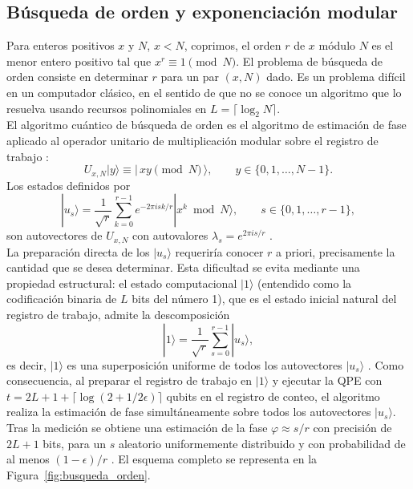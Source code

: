 \documentclass[12pt, spanish]{book}
\begin{document}
\subsection{Búsqueda de orden y exponenciación modular}
\label{sec:order_finding}

Para enteros positivos $x$ y $N$, $x < N$, coprimos, el orden $r$ de $x$ módulo $N$ es el menor entero positivo tal que $x^r \equiv 1 \pmod N$. El problema de búsqueda de orden consiste en determinar $r$ para un par $(x, N)$ dado. Es un problema difícil en un computador clásico, en el sentido de que no se conoce un algoritmo que lo resuelva usando recursos polinomiales en $L = \lceil \log_2 N \rceil$.\\  

El algoritmo cuántico de búsqueda de orden es el algoritmo de estimación de fase aplicado al operador unitario de multiplicación modular sobre el registro de trabajo \cite{Nielsen2024}:
\begin{equation}
    U_{x,N} |y\rangle \equiv |\,x y \pmod N\,\rangle, \qquad y \in \{0,1,\dots,N-1\}.
    \label{eq:U_def}
\end{equation}
Los estados definidos por
\begin{equation}
    |u_s\rangle = \frac{1}{\sqrt{r}} \sum_{k=0}^{r-1} e^{-2\pi i s k / r} |x^k \bmod N\rangle, \qquad s \in \{0, 1, \dots, r-1\},
    \label{eq:autovectores_U}
\end{equation}
son autovectores de $U_{x,N}$ con autovalores $\lambda_s = e^{2\pi i s / r}$ \cite{Nielsen2024}.\\

La preparación directa de los $|u_s\rangle$ requeriría conocer $r$ a priori, precisamente la cantidad que se desea determinar. Esta dificultad se evita mediante una propiedad estructural: el estado computacional $|1\rangle$ (entendido como la codificación binaria de $L$ bits del número 1), que es el estado inicial natural del registro de trabajo, admite la descomposición
\[
    |1\rangle = \frac{1}{\sqrt{r}}\sum_{s=0}^{r-1}|u_s\rangle,
\]
es decir, $|1\rangle$ es una superposición uniforme de todos los autovectores $|u_s\rangle$ \cite{Nielsen2024}. Como consecuencia, al preparar el registro de trabajo en $|1\rangle$ y ejecutar la QPE con $t = 2L + 1 + \lceil\log(2+1/2\epsilon)\rceil$ qubits en el registro de conteo, el algoritmo realiza la estimación de fase simultáneamente sobre todos los autovectores $|u_s\rangle$. Tras la medición se obtiene una estimación de la fase $\varphi \approx s/r$ con precisión de $2L+1$ bits, para un $s$ aleatorio uniformemente distribuido y con probabilidad de al menos $(1-\epsilon)/r$ \cite{Nielsen2024}. El esquema completo se representa en la Figura~\ref{fig:busqueda_orden}.\\
\end{document}
